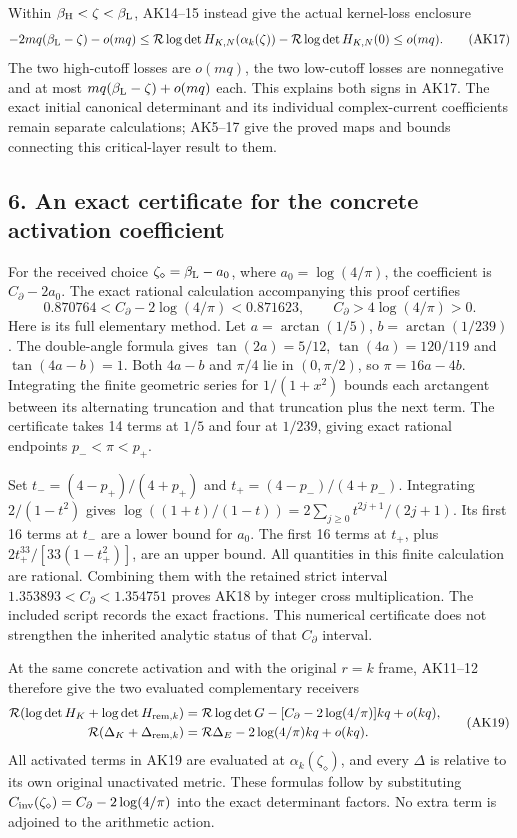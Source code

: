 Within \(\beta_{\rm H}<\zeta<\beta_{\rm L}\), AK14--15 instead give the actual kernel-loss enclosure \[
-2mq(\beta_{\rm L}-\zeta)-o(mq)
\le
\mathcal R\log\det H_{K,N}(\alpha_k(\zeta))
-\mathcal R\log\det H_{K,N}(0)
\le o(mq).
\tag{AK17}
\] The two high-cutoff losses are \(o(mq)\), the two low-cutoff losses are nonnegative and at most \(mq(\beta_{\rm L}-\zeta)+o(mq)\) each. This explains both signs in AK17. The exact initial canonical determinant and its individual complex-current coefficients remain separate calculations; AK5--17 give the proved maps and bounds connecting this critical-layer result to them.

\subsection{6. An exact certificate for the concrete activation coefficient}\label{an-exact-certificate-for-the-concrete-activation-coefficient}

For the received choice \(\zeta_\diamond=\beta_{\rm L}-a_0\), where \(a_0=\log(4/\pi)\), the coefficient is \(C_\partial-2a_0\). The exact rational calculation accompanying this proof certifies \[
0.870764<C_\partial-2\log(4/\pi)<0.871623,
\qquad C_\partial>4\log(4/\pi)>0.
\tag{AK18}
\] Here is its full elementary method. Let \(a=\arctan(1/5)\), \(b=\arctan(1/239)\). The double-angle formula gives \(\tan(2a)=5/12\), \(\tan(4a)=120/119\) and \(\tan(4a-b)=1\). Both \(4a-b\) and \(\pi/4\) lie in \((0,\pi/2)\), so \(\pi=16a-4b\). Integrating the finite geometric series for \(1/(1+x^2)\) bounds each arctangent between its alternating truncation and that truncation plus the next term. The certificate takes 14 terms at \(1/5\) and four at \(1/239\), giving exact rational endpoints \(p_-<\pi<p_+\).

Set \(t_-=(4-p_+)/(4+p_+)\) and \(t_+=(4-p_-)/(4+p_-)\). Integrating \(2/(1-t^2)\) gives \(\log((1+t)/(1-t))=2\sum_{j\ge0}t^{2j+1}/(2j+1)\). Its first 16 terms at \(t_-\) are a lower bound for \(a_0\). The first 16 terms at \(t_+\), plus \(2t_+^{33}/[33(1-t_+^2)]\), are an upper bound. All quantities in this finite calculation are rational. Combining them with the retained strict interval \(1.353893<C_\partial<1.354751\) proves AK18 by integer cross multiplication. The included script records the exact fractions. This numerical certificate does not strengthen the inherited analytic status of that \(C_\partial\) interval.

At the same concrete activation and with the original \(r=k\) frame, AK11--12 therefore give the two evaluated complementary receivers \[
\begin{aligned}
\mathcal R(\log\det H_K+\log\det H_{{\rm rem},k})
 &=\mathcal R\log\det G-[C_\partial-2\log(4/\pi)]kq+o(kq),\\
\mathcal R(\Delta_K+\Delta_{{\rm rem},k})
 &=\mathcal R\Delta_E-2\log(4/\pi)kq+o(kq).
\end{aligned}\tag{AK19}
\] All activated terms in AK19 are evaluated at \(\alpha_k(\zeta_\diamond)\), and every \(\Delta\) is relative to its own original unactivated metric. These formulas follow by substituting \(C_{\rm inv}(\zeta_\diamond)=C_\partial-2\log(4/\pi)\) into the exact determinant factors. No extra term is adjoined to the arithmetic action.

